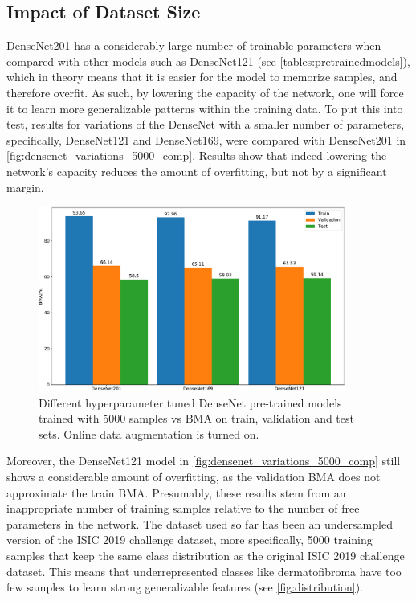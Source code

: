    \subsection{Impact of Dataset Size}
    \label{section:dataset_impact}
    DenseNet201 has a considerably large number of trainable parameters when compared with other models such as DenseNet121 (see \autoref{tables:pretrainedmodels}), which in theory means that it is easier for the model to memorize samples, and therefore overfit. As such, by lowering the capacity of the network, one will force it to learn more generalizable patterns within the training data. To put this into test, results for variations of the DenseNet with a smaller number of parameters, specifically, DenseNet121 and DenseNet169, were compared with DenseNet201 in \autoref{fig:densenet_variations_5000_comp}. Results show that indeed lowering the network's capacity reduces the amount of overfitting, but not by a significant margin.
    \begin{figure}[ht]
        \centering
        \includegraphics[width=0.9\textwidth]{figs/densenet_variations_5000_comp_2.pdf}
        \caption[Different hyperparameter tuned DenseNet pre-trained models trained with 5000 samples vs \ac{BMA} on train, validation and test sets.]{Different hyperparameter tuned DenseNet pre-trained models trained with 5000 samples vs \ac{BMA} on train, validation and test sets. Online data augmentation is turned on.}
        \label{fig:densenet_variations_5000_comp}
    \end{figure}
    
    Moreover, the DenseNet121 model in \autoref{fig:densenet_variations_5000_comp} still shows a considerable amount of overfitting, as the validation \ac{BMA} does not approximate the train \ac{BMA}. Presumably, these results stem from an inappropriate number of training samples relative to the number of free parameters in the network. The dataset used so far has been an undersampled version of the \ac{ISIC} 2019 challenge dataset, more specifically, 5000 training samples that keep the same class distribution as the original \ac{ISIC} 2019 challenge dataset. This means that underrepresented classes like dermatofibroma have too few samples to learn strong generalizable features (see \autoref{fig:distribution}). \par
    
